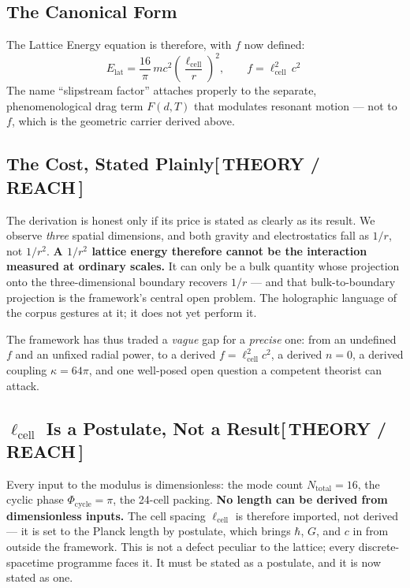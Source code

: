 \documentclass[12pt,oneside]{book}
\newcommand{\TheoryTag}{\;\colorbox{theorytag!15}{\textcolor{theorytag}{\footnotesize\bfseries [\,THEORY / REACH\,]}}}
\begin{document}
\subsection{The Canonical Form}

The Lattice Energy equation is therefore, with $f$ now defined:
\[
\boxed{\;
E_{\text{lat}}
= \frac{16}{\pi}\,m c^2 \left(\frac{\ell_{\text{cell}}}{r}\right)^2,
\qquad
f = \ell_{\text{cell}}^2\,c^2\;
\;}
\]
The name ``slipstream factor'' attaches properly to the separate,
phenomenological drag term $F(d,T)$ that modulates resonant motion --- not to
$f$, which is the geometric carrier derived above.

\subsection{The Cost, Stated Plainly\TheoryTag}

The derivation is honest only if its price is stated as clearly as its result.
We observe \emph{three} spatial dimensions, and both gravity and electrostatics
fall as $1/r$, not $1/r^2$. \textbf{A $1/r^2$ lattice energy therefore cannot be
the interaction measured at ordinary scales.} It can only be a bulk quantity
whose projection onto the three-dimensional boundary recovers $1/r$ --- and that
bulk-to-boundary projection is the framework's central open problem. The
holographic language of the corpus gestures at it; it does not yet perform it.

The framework has thus traded a \emph{vague} gap for a \emph{precise} one: from an
undefined $f$ and an unfixed radial power, to a derived $f = \ell_{\text{cell}}^2 c^2$,
a derived $n=0$, a derived coupling $\kappa = 64\pi$, and one well-posed open
question a competent theorist can attack.

\subsection{$\ell_{\text{cell}}$ Is a Postulate, Not a Result\TheoryTag}

Every input to the modulus is dimensionless: the mode count $N_{\text{total}}=16$,
the cyclic phase $\Phi_{\text{cycle}}=\pi$, the 24-cell packing. \textbf{No length
can be derived from dimensionless inputs.} The cell spacing $\ell_{\text{cell}}$
is therefore imported, not derived --- it is set to the Planck length by postulate,
which brings $\hbar$, $G$, and $c$ in from outside the framework. This is not a
defect peculiar to the lattice; every discrete-spacetime programme faces it. It
must be stated as a postulate, and it is now stated as one.
\end{document}
